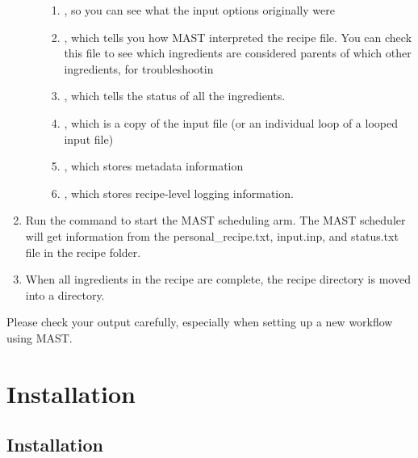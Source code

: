 \documentclass[letterpaper,10pt,english]{sphinxmanual}
\begin{document}
\begin{enumerate}
\begin{enumerate}
\begin{enumerate}
\item {} 
, so you can see what the input options originally were

\item {} 
, which tells you how MAST interpreted the recipe file. You can check this file to see which ingredients are considered parents of which other ingredients, for troubleshootin

\item {} 
, which tells the status of all the ingredients.

\item {} 
, which is a copy of the input file (or an individual loop of a looped input file)

\item {} 
, which stores metadata information

\item {} 
, which stores recipe-level logging information.

\end{enumerate}

\end{enumerate}

\item {} 
Run the command  to start the MAST scheduling arm. The MAST scheduler will get information from the personal\_recipe.txt, input.inp, and status.txt file in the recipe folder.

\item {} 
When all ingredients in the recipe are complete, the recipe directory is moved into a  directory.

\end{enumerate}

Please check your output carefully, especially when setting up a new workflow using MAST.


\chapter{Installation}
\label{1_0_installation:installation}\label{1_0_installation::doc}

\section{Installation}
\label{1_0_installation:id1}
\end{document}
